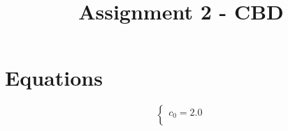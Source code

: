 \documentclass[a4paper,12pt]{article}
\begin{document}
\title{Assignment 2 - CBD}\date{}\maketitle
\section{Equations}
\[
\left\{
\begin{array}{c}
c_0 = 2.0 \\
\end{array}
\right.
\]
\end{document}
